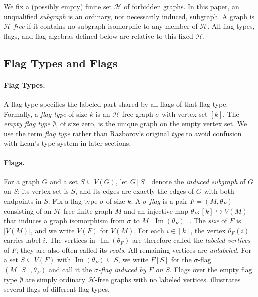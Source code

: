 \documentclass{article}
\begin{document}
We fix a (possibly empty) finite set $\mathcal{H}$ of forbidden graphs.  In this
paper, an unqualified \emph{subgraph} is an ordinary, not necessarily induced,
subgraph.  A graph is \emph{\(\mathcal{H}\)-free} if it contains no subgraph
isomorphic to any member of $\mathcal{H}$.  All flag types, flags, and flag
algebras defined below are relative to this fixed $\mathcal{H}$.

\subsection{Flag Types and Flags}

\paragraph{Flag Types.}
A flag type specifies the labeled part shared by all flags of that flag type.
Formally, a \emph{flag type} of size $k$ is an \(\mathcal{H}\)-free graph
\(\sigma\) with vertex set $[k]$.  The \emph{empty flag type} $\emptyset$, of
size zero, is the unique graph on the empty vertex set.
We use the term \emph{flag type} rather than Razborov's original \emph{type}
to avoid confusion with Lean's type system in later sections.

\paragraph{Flags.}
For a graph $G$ and a set $S\subseteq V(G)$, let $G[S]$ denote the
\emph{induced subgraph} of $G$ on $S$: its vertex set is $S$, and its edges are
exactly the edges of $G$ with both endpoints in $S$.
Fix a flag type $\sigma$ of size $k$.
A \emph{$\sigma$-flag} is a pair $F = (M, \theta_F)$ consisting of an
\(\mathcal{H}\)-free finite graph $M$ and an injective map
$\theta_F : [k] \hookrightarrow V(M)$ that induces a graph isomorphism from
$\sigma$ to $M[\operatorname{Im}(\theta_F)]$.  The \emph{size} of $F$ is
$|V(M)|$, and we write $V(F)$ for $V(M)$.
For each $i\in[k]$, the vertex $\theta_F(i)$ carries label $i$.  The vertices
in~$\operatorname{Im}(\theta_F)$ are therefore called the
\emph{labeled vertices} of $F$; they are also often called its \emph{roots}.
All remaining vertices are \emph{unlabeled}.
For a set $S \subseteq V(F)$ with $\operatorname{Im}(\theta_F) \subseteq S$,
we write $F[S]$ for the $\sigma$-flag $(M[S], \theta_F)$ and call it the
\emph{$\sigma$-flag induced by $F$ on $S$}.
Flags over the empty flag type $\emptyset$ are simply ordinary
\(\mathcal{H}\)-free graphs with no labeled vertices.
 illustrates several flags of different flag types.
\end{document}
